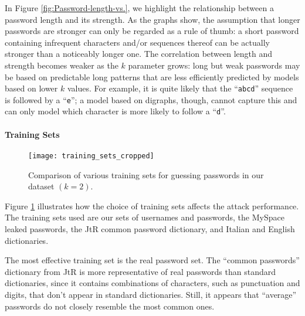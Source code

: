 \documentclass[a4paper,twocolumn]{article}
\begin{document}
In Figure \ref{fig:Password-length-vs.}, we highlight the relationship
between a password length and its strength. As the graphs show, the
assumption that longer passwords are stronger can only be regarded
as a rule of thumb: a short password containing infrequent characters
and/or sequences thereof can be actually stronger than a noticeably
longer one. The correlation between length and strength becomes weaker
as the $k$ parameter grows: long but weak passwords may be based
on predictable long patterns that are less efficiently predicted by
models based on lower $k$ values. For example, it is quite likely
that the {}``\texttt{abcd}'' sequence is followed by a {}``\texttt{e}'';
a model based on digraphs, though, cannot capture this and can only
model which character is more likely to follow a {}``\texttt{d}''.


\paragraph{Training Sets}

\begin{figure}
\begin{centering}
\texttt{[image: training\_sets\_cropped]}
\par\end{centering}

\caption{\label{fig:Comparing-training-sets.}Comparison of various training
sets for guessing passwords in our dataset $\left(k=2\right)$.}

\end{figure}


Figure \ref{fig:Comparing-training-sets.} illustrates how the choice
of training sets affects the attack performance. The training sets
used are our sets of usernames and passwords, the MySpace leaked passwords,
the JtR common password dictionary, and Italian and English dictionaries.

The most effective training set is the real password set. The {}``common
passwords'' dictionary from\emph{ }JtR is more representative of
real passwords than standard dictionaries, since it contains combinations
of characters, such as punctuation and digits, that don't appear in
standard dictionaries. Still, it appears that {}``average'' passwords
do not closely resemble the most common ones.
\end{document}
